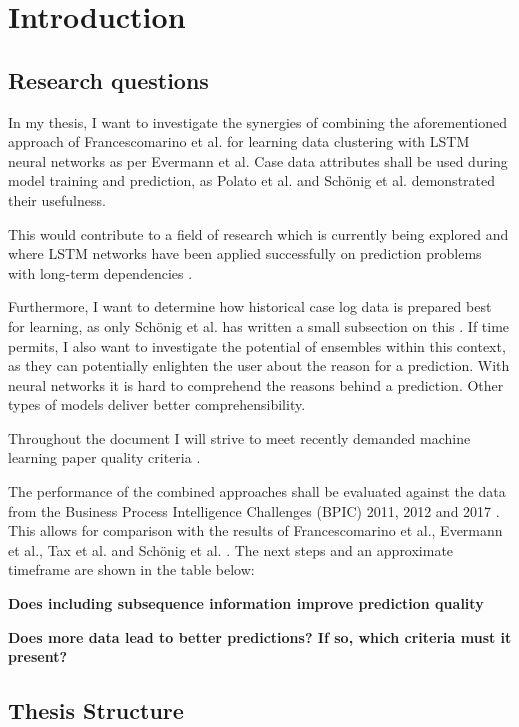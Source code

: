 \chapter{Introduction}\label{sec:intro}


\section{Research questions}\label{sec:intro:objective}
In my thesis, I want to investigate the synergies of combining the aforementioned approach of Francescomarino et al. for learning data clustering with LSTM neural networks as per Evermann et al. Case data attributes shall be used during model training and prediction, as Polato et al. \cite{polato2014} and Schönig et al. \cite{schoenig2018} demonstrated their usefulness.

This would contribute to a field of research which is currently being explored and where LSTM networks have been applied successfully on prediction problems with long-term dependencies \cite{evermann2016, tax2017, schoenig2018, graves2005}.

Furthermore, I want to determine how historical case log data is prepared best for learning, as only Schönig et al. has written a small subsection on this \cite{schoenig2018}.
If time permits, I also want to investigate the potential of ensembles within this context, as they can potentially enlighten the user about the reason for a prediction.
With neural networks it is hard to comprehend the reasons behind a prediction.
Other types of models deliver better comprehensibility.

Throughout the document I will strive to meet recently demanded machine learning paper quality criteria \cite{lipton2018}.

The performance of the combined approaches shall be evaluated against the data from the Business Process Intelligence Challenges (BPIC) 2011, 2012 and 2017 \cite{BPIC2011, BPIC2012, BPIC2017}. This allows for comparison with the results of Francescomarino et al., Evermann et al., Tax et al. and Schönig et al. \cite{francescomarino2018, evermann2016, tax2017, schoenig2018}.
The next steps and an approximate timeframe are shown in the table below:\\[1em]


\textbf{Does including subsequence information improve prediction quality}

\textbf{Does more data lead to better predictions? If so, which criteria must it present?}

\section{Thesis Structure}\label{sec:intro:structure}


